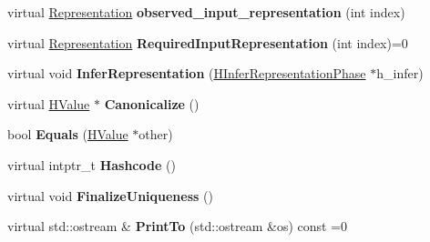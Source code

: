 \begin{DoxyCompactItemize}
\item 
virtual \hyperlink{classv8_1_1internal_1_1_representation}{Representation} {\bfseries observed\+\_\+input\+\_\+representation} (int index)\hypertarget{classv8_1_1internal_1_1_h_value_a454a8ece64d922ecc506dd4a16385767}{}\label{classv8_1_1internal_1_1_h_value_a454a8ece64d922ecc506dd4a16385767}

\item 
virtual \hyperlink{classv8_1_1internal_1_1_representation}{Representation} {\bfseries Required\+Input\+Representation} (int index)=0\hypertarget{classv8_1_1internal_1_1_h_value_aa6dd667b98d1a58fccbabe464cfd108e}{}\label{classv8_1_1internal_1_1_h_value_aa6dd667b98d1a58fccbabe464cfd108e}

\item 
virtual void {\bfseries Infer\+Representation} (\hyperlink{classv8_1_1internal_1_1_h_infer_representation_phase}{H\+Infer\+Representation\+Phase} $\ast$h\+\_\+infer)\hypertarget{classv8_1_1internal_1_1_h_value_a23d1ce318079ac9964ef49cecc88640b}{}\label{classv8_1_1internal_1_1_h_value_a23d1ce318079ac9964ef49cecc88640b}

\item 
virtual \hyperlink{classv8_1_1internal_1_1_h_value}{H\+Value} $\ast$ {\bfseries Canonicalize} ()\hypertarget{classv8_1_1internal_1_1_h_value_abe96699770827e0dc2404e954357630c}{}\label{classv8_1_1internal_1_1_h_value_abe96699770827e0dc2404e954357630c}

\item 
bool {\bfseries Equals} (\hyperlink{classv8_1_1internal_1_1_h_value}{H\+Value} $\ast$other)\hypertarget{classv8_1_1internal_1_1_h_value_a0daf995c06fb2c5d68db5f9c3830831a}{}\label{classv8_1_1internal_1_1_h_value_a0daf995c06fb2c5d68db5f9c3830831a}

\item 
virtual intptr\+\_\+t {\bfseries Hashcode} ()\hypertarget{classv8_1_1internal_1_1_h_value_aaaddf433f006258ad1d88ed80a2066b1}{}\label{classv8_1_1internal_1_1_h_value_aaaddf433f006258ad1d88ed80a2066b1}

\item 
virtual void {\bfseries Finalize\+Uniqueness} ()\hypertarget{classv8_1_1internal_1_1_h_value_a678c14133c345e29116e35212da724da}{}\label{classv8_1_1internal_1_1_h_value_a678c14133c345e29116e35212da724da}

\item 
virtual std\+::ostream \& {\bfseries Print\+To} (std\+::ostream \&os) const  =0\hypertarget{classv8_1_1internal_1_1_h_value_aa0aa5727333e9e95b4ee2bb971023530}{}\label{classv8_1_1internal_1_1_h_value_aa0aa5727333e9e95b4ee2bb971023530}


\end{DoxyCompactItemize}
